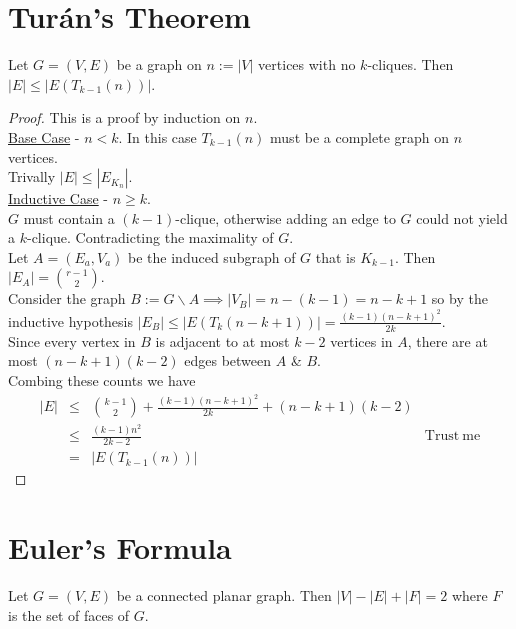 \documentclass[11pt,a4paper]{article}
\begin{document}
\section*{Tur\'an's Theorem}
Let $G=(V,E)$ be a graph on $n:=|V|$ vertices with no $k$-cliques. Then $|E|\leq|E(T_{k-1}(n))|$.
\begin{proof}
This is a proof by induction on $n$.\\
\underline{Base Case} - $n<k$.
In this case $T_{k-1}(n)$ must be a complete graph on $n$ vertices.\\
Trivally $|E|\leq|E_{K_n}|$.\\

\underline{Inductive Case} - $n\geq k$.\\
$G$ must contain a $(k-1)$-clique, otherwise adding an edge to $G$ could not yield a $k$-clique. Contradicting the maximality of $G$.\\
Let $A=(E_a,V_a)$ be the induced subgraph of $G$ that is $K_{k-1}$. Then $|E_A|={{r-1}\choose{2}}$.\\
Consider the graph $B:=G\backslash A\implies|V_B|=n-(k-1)=n-k+1$ so by the inductive hypothesis $|E_B|\leq|E(T_{k}(n-k+1))|=\frac{(k-1)(n-k+1)^2}{2k}$.\\
Since every vertex in $B$ is adjacent to at most $k-2$ vertices in $A$, there are at most $(n-k+1)(k-2)$ edges between $A$ \& $B$.\\
Combing these counts we have
\[\begin{array}{rcl|l}
|E|&\leq&{{k-1}\choose{2}}+\frac{(k-1)(n-k+1)^2}{2k}+(n-k+1)(k-2)\\
&\leq&\frac{(k-1)n^2}{2k-2}&\mathrm{Trust\ me}\\
&=&|E(T_{k-1}(n))|
\end{array}\]
\end{proof}

\newpage
\section*{Euler's Formula}
Let $G=(V,E)$ be a connected planar graph. Then $|V|-|E|+|F|=2$ where $F$ is the set of faces of $G$.
\end{document}
